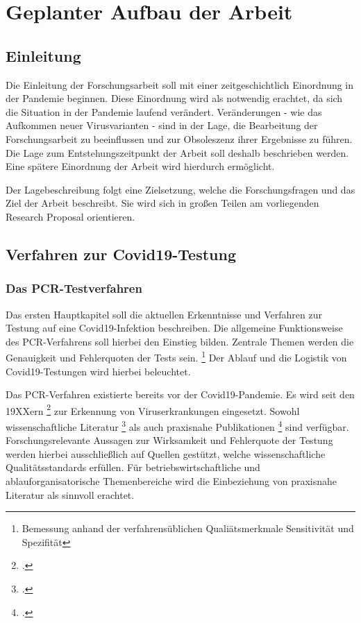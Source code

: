 
\chapter{Geplanter Aufbau der Arbeit}
\section{Einleitung}
Die Einleitung der Forschungsarbeit soll mit einer zeitgeschichtlich Einordnung in der Pandemie beginnen.
Diese Einordnung wird als notwendig erachtet, da sich die Situation in der Pandemie laufend verändert.
Veränderungen - wie das Aufkommen neuer Virusvarianten - sind in der Lage, die Bearbeitung der Forschungsarbeit zu beeinflussen und zur Obsoleszenz ihrer Ergebnisse zu führen.
Die Lage zum Entstehungszeitpunkt der Arbeit soll deshalb beschrieben werden.
Eine spätere Einordnung der Arbeit wird hierdurch ermöglicht.

Der Lagebeschreibung folgt eine Zielsetzung, welche die Forschungsfragen und das Ziel der Arbeit beschreibt.
Sie wird sich in großen Teilen am vorliegenden Research Proposal orientieren.

\section{Verfahren zur Covid19-Testung}
\subsection{Das PCR-Testverfahren}
Das ersten Hauptkapitel soll die aktuellen Erkenntnisse und Verfahren zur Testung auf eine Covid19-Infektion beschreiben.
Die allgemeine Funktionsweise des PCR-Verfahrens soll hierbei den Einstieg bilden.
Zentrale Themen werden die Genauigkeit und Fehlerquoten der Tests sein.
\footnote{Bemessung anhand der verfahrensüblichen Qualiätsmerkmale Sensitivität und Spezifität}
Der Ablauf und die Logistik von Covid19-Testungen wird hierbei beleuchtet.

Das PCR-Verfahren existierte bereits vor der Covid19-Pandemie.
Es wird seit den 19XXern
\footcite{Quelle erster Masseneinsatz PCR}
zur Erkennung von Viruserkrankungen eingesetzt.
Sowohl wissenschaftliche Literatur
\footcite{Wissenschaftlich PCR}
als auch praxisnahe Publikationen
\footcite{Praxishandbuch PCR}
sind verfügbar.
Forschungsrelevante Aussagen zur Wirksamkeit und Fehlerquote der Testung werden hierbei ausschließlich auf Quellen gestützt, welche wissenschaftliche Qualitätsstandards erfüllen.
Für betriebswirtschaftliche und ablauforganisatorische Themenbereiche wird die Einbeziehung von praxisnahe Literatur als sinnvoll erachtet.

